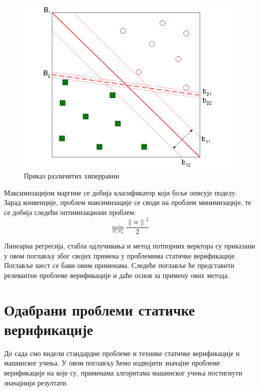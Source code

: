 \documentclass[a4paper]{article}
\newcommand{\norm}[1]{\left\lVert#1\right\rVert}
\begin{document}
{\begin{figure}[h!]
\begin{center}
\includegraphics[scale=0.4]{./slike/svm.png}
\end{center}
\caption{Приказ различитих хиперравни}
\label{fig:svm}
\end{figure}

Максимизацијом маргине се добија класификатор који боље описује поделу. Зарад конвенције, проблем максимизације се своди на проблем минимизације, те се добија следећи оптимизациони проблем:
\begin{equation}
    \min_{w, w_0} \frac{ {\norm{w}}^2 }{2}
\end{equation}


Линеарна регресија, стабла одлучивања и метод потпорних верктора су приказани у овом поглављу због својих примена у проблемима статичке верификације. Поглавље шест се бави овим применама. Следеће поглавље ће представити релевантне проблеме верификације и даће основ за примену ових метода.

\section{Одабрани проблеми статичке верификације}
До сада смо видели стандардне проблеме и технике статичке верификације и машинског учења. У овом поглављу ћемо издвојити значајне проблеме верификације на које су, применама алгоритама машинског учења постигнути значајнији резултати.


}
\end{document}

